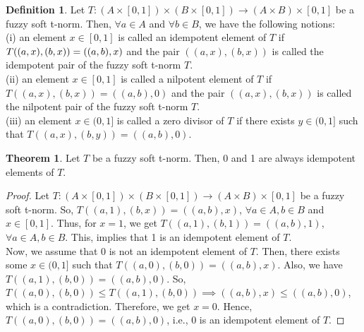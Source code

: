 \documentclass{article}
\theoremstyle{definition}
\newtheorem{theorem}{Theorem}[section]
\newtheorem{definition}{Definition}[section]
\begin{document}
\begin{definition}
    Let $T:(A\times[0, 1])\times (B\times[0, 1]) \to (A\times B)\times[0, 1]$ be a fuzzy soft t-norm. Then, $\forall a\in A$ and $\forall b\in B$, we have the following notions:\\
    
    (i) an element $x\in [0, 1]$ is called an idempotent element of $T$ if $T((a, x), (b, x))\\=((a, b), x)$ and the pair $((a, x), (b, x))$ is called the idempotent pair of the fuzzy soft t-norm $T$.\\
    
    (ii) an element $x\in [0, 1]$ is called a nilpotent element of $T$ if $T((a, x), (b, x))=((a, b), 0)$ and the pair $((a, x), (b, x))$ is called the nilpotent pair of the fuzzy soft t-norm $T$.\\
    
    (iii) an element $x\in (0, 1]$ is called a zero divisor of $T$ if there exists $y\in (0, 1]$ such that $T((a, x), (b, y))=((a, b), 0)$.\\
    
\end{definition}

\begin{theorem}
    Let $T$ be a fuzzy soft t-norm. Then, 0 and 1 are always idempotent elements of $T$.
\end{theorem}
\begin{proof}
    Let $T:(A\times[0, 1])\times (B\times[0, 1]) \to (A\times B)\times[0, 1]$ be a fuzzy soft t-norm. So, $T((a, 1), (b, x))=((a, b), x)$, $\forall a\in A, b\in B$ and $x\in [0, 1] $. Thus, for $x=1$, we get $T((a, 1), (b, 1))=((a, b), 1)$,  $\forall a\in A, b\in B$. This, implies that 1 is an idempotent element of $T$.\\

    Now, we assume that 0 is not an idempotent element of $T$. Then, there exists some $x\in (0, 1]$ such that $T((a, 0), (b, 0))=((a, b), x)$. Also, we have $T((a, 1), (b, 0))=((a, b), 0)$. So, $T((a, 0), (b, 0))\leq T((a, 1), (b, 0))\implies ((a, b), x)\leq ((a, b), 0)$, which is a contradiction. Therefore, we get $x=0$. Hence, $T((a, 0), (b, 0))=((a, b), 0)$, i.e., 0 is an idempotent element of $T$. 
\end{proof}
\end{document}
